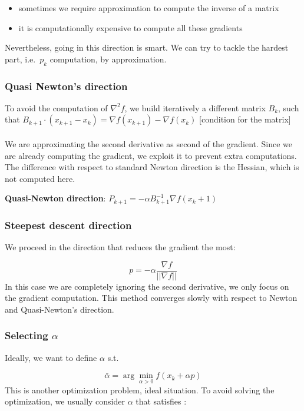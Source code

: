 \begin{itemize}
\tightlist
\item
  sometimes we require approximation to compute the inverse of a matrix
\item
  it is computationally expensive to compute all these gradients
\end{itemize}
\noindent
Nevertheless, going in this direction is smart. We can try to tackle the hardest part, i.e.~$p_k$ computation, by
approximation.


\subsubsection{Quasi Newton's direction}

To avoid the computation of $\nabla^2 f$, we build iteratively a
different matrix $B_k$, such that
$B_{k+1}\cdot (x_{k+1}-x_k) = \nabla f(x_{k+1})-\nabla f(x_k)$
{[}condition for the matrix{]}
\\
\\
\noindent
We are approximating the second derivative as second of the gradient.
Since we are already computing the gradient, we exploit it to prevent
extra computations. The difference with respect to standard Newton
direction is the Hessian, which is not computed here.

\textbf{Quasi-Newton direction}:
$P_{k+1}=- \alpha B_{k+1}^{-1} \nabla f(x_k+1)$


\subsubsection{Steepest descent direction}

We proceed in the direction that reduces the gradient the most:

$$
p= -\alpha \frac{\nabla f}{||\nabla f||}
$$
\noindent
In this case we are completely ignoring the second derivative, we only
focus on the gradient computation. This method converges slowly with
respect to Newton and Quasi-Newton's direction.

\hypertarget{selecting-alpha}{%
\subsubsection{\texorpdfstring{Selecting
$\alpha$}{Selecting }}\label{selecting-alpha}}

Ideally, we want to define $\alpha$ s.t.

$$
\bar{\alpha}= \arg \min_{\alpha>0} f(x_k+\alpha p)
$$
\noindent
This is another optimization problem, ideal situation. To avoid solving
the optimization, we usually consider $\alpha$ that satisfies :

